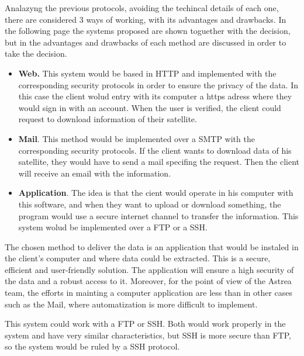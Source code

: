 Analazyng the previous protocols, avoiding the techincal details of each one, there are considered 3 ways of working, with its advantages and drawbacks. In the following page the systems proposed are shown toguether with the decision, but in \cite[Chapter 2, Section 3]{annex3} the advantages and drawbacks of each method are discussed in order to take the decision.
\begin{itemize}
\item \textbf{Web.} This system would be based in HTTP and implemented with the corresponding security protocols in order to ensure the privacy of the data. In this case the client wolud entry with its computer a https adress where they would sign in with an account. When the user is verified, the client could request to download information of their satellite. 
\item \textbf{Mail}. This method would be implemented over a SMTP with the corresponding security protocols. If the client wants to download data of his satellite, they would have to send a mail specifing the request. Then the client will receive an email with the information.
\item \textbf{Application}.  The idea is that the cient would operate in his computer with this software, and when they want to upload or download something, the program would use a secure internet channel to transfer the information. This system wolud be implemented over a FTP or a SSH. 
\end{itemize}

The chosen method to deliver the data is an application that would be instaled in the client's computer and where data could be extracted. This is a secure, efficient and user-friendly solution. The application will ensure a high security of the data and a robust access to it. Moreover, for the point of view of the Astrea team, the efforts in mainting a computer application are less than in other cases such as the Mail, where automatization is more difficult to implement.

This system could work with a FTP or SSH. Both would work properly in the system and have very similar characteristics, but SSH is more secure than FTP, so the system would be ruled by a SSH protocol.